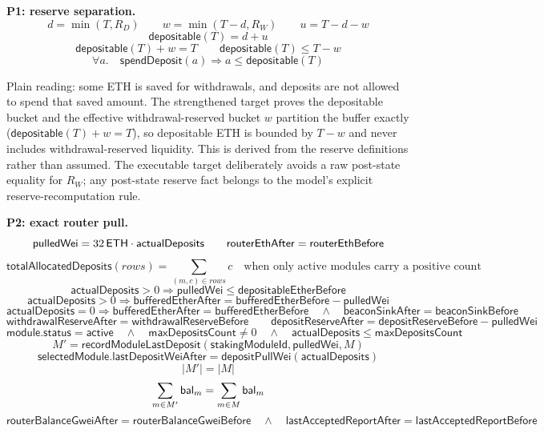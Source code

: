 \medskip
\noindent\textbf{P1: reserve separation.}
\[
  d = \min(T,R_D)
  \qquad
  w = \min(T-d,R_W)
  \qquad
  u = T-d-w
\]
\[
  \mathsf{depositable}(T) = d + u
\]
\[
  \mathsf{depositable}(T) + w = T
  \qquad
  \mathsf{depositable}(T) \leq T - w
\]
\[
  \forall a.\quad
  \mathsf{spendDeposit}(a) \Rightarrow
  a \leq \mathsf{depositable}(T)
\]

\noindent Plain reading: some ETH is saved for withdrawals, and deposits are not
allowed to spend that saved amount. The strengthened target proves the depositable
bucket and the effective withdrawal-reserved bucket \(w\) partition the buffer
exactly (\(\mathsf{depositable}(T) + w = T\)), so depositable ETH is bounded by
\(T - w\) and never includes withdrawal-reserved liquidity. This is derived from the
reserve definitions rather than assumed. The executable target deliberately avoids a
raw post-state equality for \(R_W\); any post-state reserve fact belongs to the
model's explicit reserve-recomputation rule.

\medskip
\noindent\textbf{P2: exact router pull.}
\[
  \mathsf{pulledWei}
    = 32\,\mathsf{ETH} \cdot \mathsf{actualDeposits}
  \qquad
  \mathsf{routerEthAfter} = \mathsf{routerEthBefore}
\]
\[
  \mathsf{totalAllocatedDeposits}(\mathit{rows})
    = \sum_{(m,c) \in \mathit{rows}} c
  \quad \mbox{when only active modules carry a positive count}
\]
\[
  \mathsf{actualDeposits} > 0
  \Rightarrow
  \mathsf{pulledWei} \le \mathsf{depositableEtherBefore}
\]
\[
  \mathsf{actualDeposits} > 0
  \Rightarrow
  \mathsf{bufferedEtherAfter}
    = \mathsf{bufferedEtherBefore} - \mathsf{pulledWei}
\]
\[
  \mathsf{actualDeposits} = 0
  \Rightarrow
  \mathsf{bufferedEtherAfter} = \mathsf{bufferedEtherBefore}
  \quad\land\quad
  \mathsf{beaconSinkAfter} = \mathsf{beaconSinkBefore}
\]
\[
  \mathsf{withdrawalReserveAfter} = \mathsf{withdrawalReserveBefore}
  \qquad
  \mathsf{depositReserveAfter}
    = \mathsf{depositReserveBefore} - \mathsf{pulledWei}
\]
\[
  \mathsf{module.status} = \mathsf{active}
  \quad\land\quad
  \mathsf{maxDepositsCount} \ne 0
  \quad\land\quad
  \mathsf{actualDeposits} \le \mathsf{maxDepositsCount}
\]
\[
  M' =
    \mathsf{recordModuleLastDeposit}(
      \mathsf{stakingModuleId},\mathsf{pulledWei},M)
\]
\[
  \mathsf{selectedModule.lastDepositWeiAfter}
    = \mathsf{depositPullWei}(\mathsf{actualDeposits})
\]
\[
  |M'| = |M|
\]
\[
  \sum_{m\in M'} \mathsf{bal}_m = \sum_{m\in M} \mathsf{bal}_m
\]
\[
  \mathsf{routerBalanceGweiAfter} = \mathsf{routerBalanceGweiBefore}
  \quad\land\quad
  \mathsf{lastAcceptedReportAfter} = \mathsf{lastAcceptedReportBefore}
\]

